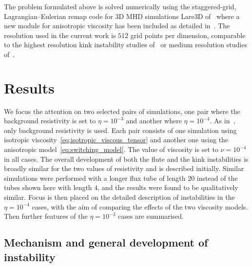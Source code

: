 \documentclass[fleqn,usenatbib]{mnras}
\begin{document}
The problem formulated above is solved numerically using the
  staggered-grid, Lagrangian–Eulerian remap code for 3D MHD
  simulations Lare3D of~\cite{arberStaggeredGridLagrangian2001} where
  a  new module for anisotropic viscosity has been
  included as detailed in~\citet{quinnKelvinHelmholtzInstabilityCollapse2021}. The resolution used in the
current work is  $512$ grid points per dimension, comparable to the
highest resolution kink instability studies
of~\cite{hoodCoronalHeatingMagnetic2009} or medium resolution studies
of~\cite{barefordShockHeatingNumerical2015}. 

\section{Results}
\label{sec-results}

We focus the attention
on two selected pairs of  
simulations, one pair where the background resistivity is set to
$\eta=10^{-3}$ and another where $\eta=10^{-4}$. As
in~\citet{quinnEffectAnisotropicViscosity2020}, only background
resistivity is used. Each pair consists of one simulation
using isotropic viscosity~\eqref{eq:isotropic_viscous_tensor} and
another one using the anisotropic model~\eqref{eq:switching_model}. The
value of viscosity is set to $\nu = 10^{-4}$ in all cases. 
%
The overall development of both the flute and the kink
instabilities is broadly similar for the two values of resistivity and
is described  initially. Similar simulations were performed with a longer flux tube of length $20$ instead of the tubes shown here with length $4$, and the results were found to be qualitatively similar. Focus is 
then placed on the detailed description of instabilities in the
$\eta=10^{-4}$ cases, with the aim of comparing the effects of the two
viscosity models. Then further features of the $\eta=10^{-3}$
cases are summarised.

\subsection{Mechanism and
    general development of instability}
\end{document}
